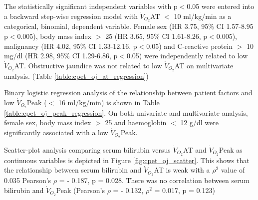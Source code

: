 The statistically significant independent variables with p$<$0.05 were entered into a backward step-wise regression model with $\dot{V}_{O_2}$AT $<$ 10 ml/kg/min as a categorical, binomial, dependent variable. Female sex (HR 3.75, 95\% CI 1.57-8.95 p$<$0.005), body mass index $>$ 25 (HR 3.65, 95\% CI 1.61-8.26, p$<$0.005), malignancy (HR 4.02, 95\% CI 1.33-12.16, p$<$0.05) and C-reactive protein $>$ 10 mg/dl (HR 2.98, 95\% CI 1.29-6.86, p$<$0.05) were independently related to low $\dot{V}_{O_2}$AT. Obstructive jaundice was not related to low $\dot{V}_{O_2}$AT on multivariate analysis. (Table \ref{table:cpet_oj_at_regression})

Binary logistic regression analysis of the relationship between patient factors and low $\dot{V}_{O_2}$Peak ($<$ 16 ml/kg/min) is shown in Table \ref{table:cpet_oj_peak_regression}. On both univariate and multivariate analysis, female sex, body mass index $>$ 25 and haemoglobin $<$ 12 g/dl were significantly associated with a low $\dot{V}_{O_2}$Peak. 




\clearpage

Scatter-plot analysis comparing serum bilirubin versus $\dot{V}_{O_2}$AT and $\dot{V}_{O_2}$Peak as continuous variables is depicted in Figure \ref{fig:cpet_oj_scatter}. This shows that the relationship between serum bilirubin and $\dot{V}_{O_2}$AT is weak with a $\rho^2$ value of 0.035 Pearson's $\rho$ = - 0.187, p = 0.028. There was no correlation between serum bilirubin and $\dot{V}_{O_2}$Peak (Pearson's $\rho$ = - 0.132, $\rho^2$ = 0.017, p = 0.123)


